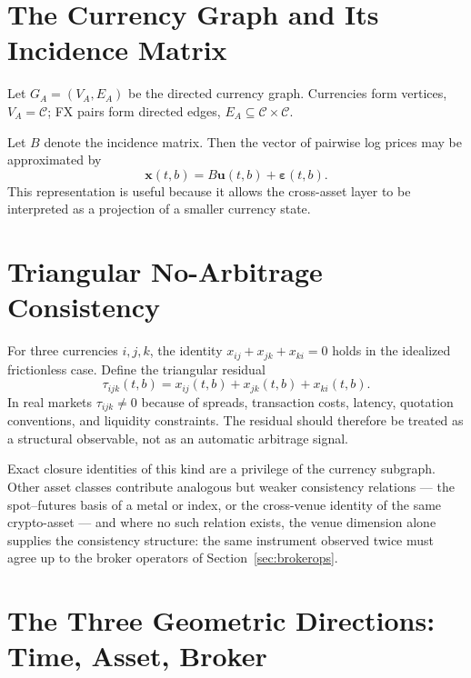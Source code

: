 \documentclass[11pt,a4paper]{article}
\numberwithin{equation}{section}
\newcommand{\Cset}{\mathcal{C}}
\begin{document}
\section{The Currency Graph and Its Incidence Matrix}

Let $G_A=(V_A,E_A)$ be the directed currency graph. Currencies form
vertices, $V_A=\Cset$; FX pairs form directed edges,
$E_A\subseteq\Cset\times\Cset$.

Let $B$ denote the incidence matrix. Then the vector of pairwise log
prices may be approximated by
\begin{equation}
\bm{x}(t,b)=B\bm{u}(t,b)+\bm{\varepsilon}(t,b).
\label{eq:graph_model}
\end{equation}
This representation is useful because it allows the cross-asset
layer to be interpreted as a projection of a smaller currency state.

\section{Triangular No-Arbitrage Consistency}

For three currencies $i,j,k$, the identity
$x_{ij}+x_{jk}+x_{ki}=0$ holds in the idealized frictionless case.
Define the triangular residual
\begin{equation}
\tau_{ijk}(t,b)=x_{ij}(t,b)+x_{jk}(t,b)+x_{ki}(t,b).
\label{eq:triangle}
\end{equation}
In real markets $\tau_{ijk}\neq0$ because of spreads, transaction
costs, latency, quotation conventions, and liquidity constraints.
The residual should therefore be treated as a structural observable,
not as an automatic arbitrage signal.

Exact closure identities of this kind are a privilege of the
currency subgraph. Other asset classes contribute analogous but
weaker consistency relations --- the spot--futures basis of a metal
or index, or the cross-venue identity of the same crypto-asset ---
and where no such relation exists, the venue dimension alone
supplies the consistency structure: the same instrument observed
twice must agree up to the broker operators of
Section~\ref{sec:brokerops}.

\section{The Three Geometric Directions: Time, Asset, Broker}
\end{document}
